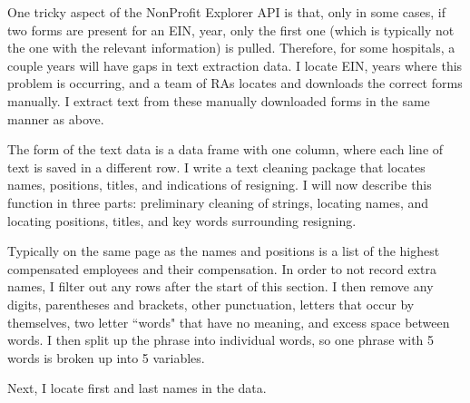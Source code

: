 \documentclass[12pt]{article}
\begin{document}
    One tricky aspect of the NonProfit Explorer API is that, only in some cases, if two forms are present for an EIN, year, only the first one (which is typically not the one with the relevant information) is pulled. Therefore, for some hospitals, a couple years will have gaps in text extraction data. I locate EIN, years where this problem is occurring, and a team of RAs locates and downloads the correct forms manually. I extract text from these manually downloaded forms in the same manner as above. 

    The form of the text data is a data frame with one column, where each line of text is saved in a different row. I write a text cleaning package that locates names, positions, titles, and indications of resigning. I will now describe this function in three parts: preliminary cleaning of strings, locating names, and locating positions, titles, and key words surrounding resigning. 

    Typically on the same page as the names and positions is a list of the highest compensated employees and their compensation. In order to not record extra names, I filter out any rows after the start of this section. I then remove any digits, parentheses and brackets, other punctuation, letters that occur by themselves, two letter ``words" that have no meaning, and excess space between words. I then split up the phrase into individual words, so one phrase with 5 words is broken up into 5 variables. 

    Next, I locate first and last names in the data. 


    

    

    

    

    

    

	
	
	
\end{document}
